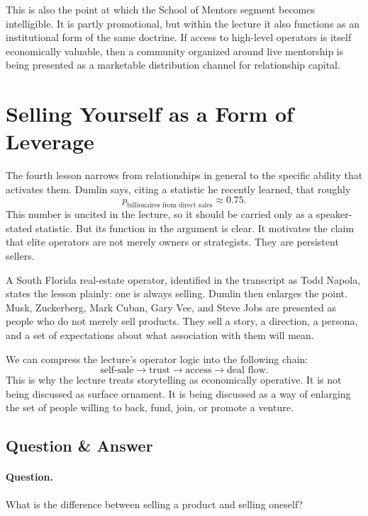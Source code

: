 This is also the point at which the School of Mentors segment becomes intelligible. It is partly promotional, but within the lecture it also functions as an institutional form of the same doctrine. If access to high-level operators is itself economically valuable, then a community organized around live mentorship is being presented as a marketable distribution channel for relationship capital.

\section{Selling Yourself as a Form of Leverage}

The fourth lesson narrows from relationships in general to the specific ability that activates them. Dumlin says, citing a statistic he recently learned, that roughly
\begin{equation}
p_{\text{billionaires from direct sales}} \approx 0.75.
\end{equation}
This number is uncited in the lecture, so it should be carried only as a speaker-stated statistic. But its function in the argument is clear. It motivates the claim that elite operators are not merely owners or strategists. They are persistent sellers.

A South Florida real-estate operator, identified in the transcript as Todd Napola, states the lesson plainly: one is always selling. Dumlin then enlarges the point. Musk, Zuckerberg, Mark Cuban, Gary Vee, and Steve Jobs are presented as people who do not merely sell products. They sell a story, a direction, a persona, and a set of expectations about what association with them will mean.

We can compress the lecture's operator logic into the following chain:
\begin{equation}
\text{self-sale} \to \text{trust} \to \text{access} \to \text{deal flow}.
\end{equation}
This is why the lecture treats storytelling as economically operative. It is not being discussed as surface ornament. It is being discussed as a way of enlarging the set of people willing to back, fund, join, or promote a venture.

\subsection{Question \& Answer}

\paragraph{Question.} What is the difference between selling a product and selling oneself?


